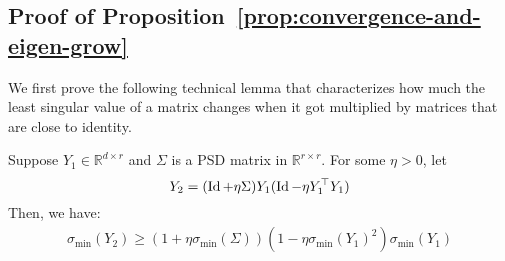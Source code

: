 \subsection{Proof of Proposition~\ref{prop:convergence-and-eigen-grow}}

We first prove the following technical lemma that characterizes how much the least singular value of a matrix changes when it got multiplied by matrices that are close to identity. 
\begin{lem}\label{lem:eigen_upper}
Suppose $Y_1\in \mathbb{R}^{d\times r}$ and $\Sigma$ is a PSD matrix in $\mathbb{R}^{r \times r}$. For some $\eta > 0$, let 
$$Y_2 =  (\operatorname{Id} + \eta \Sigma)Y_1 (\operatorname{Id} - \eta Y_1^{\top}  Y_1)$$
Then, we have:  
\begin{align*}
\sigma_{\min} (Y_2) \geq \left(1 + \eta \sigma_{\min}(\Sigma) \right)\left(1 - \eta \sigma_{\min}(Y_1)^2\right) \sigma_{\min}(Y_1)
\end{align*}
\end{lem}

